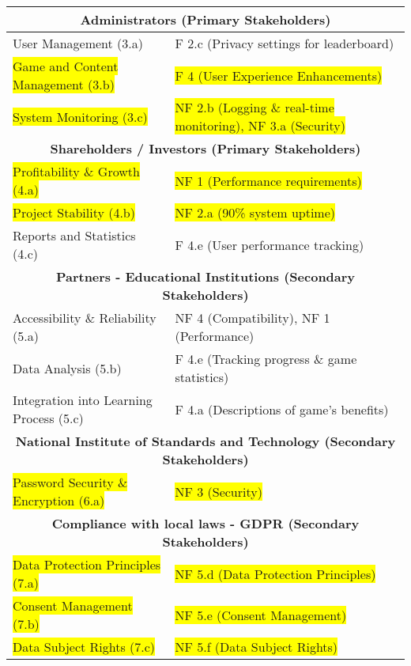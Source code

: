 \documentclass[11pt,a4paper]{article}
\begin{document}
\begin{table}[H]
\begin{tabular}{|l|l|}
\hline
\multicolumn{2}{|c|}{\textbf{Administrators (Primary Stakeholders)}}                                   \\
\hline
User Management (3.a)                 &  F 2.c (Privacy settings for leaderboard)    \\
\colorbox{yellow}{Game and Content Management (3.b)}            & \colorbox{yellow}{F 4 (User Experience Enhancements)  }         \\
\colorbox{yellow}{System Monitoring (3.c)}   & \colorbox{yellow}{NF 2.b (Logging \& real-time monitoring), NF 3.a (Security)} \\
\hline
\multicolumn{2}{|c|}{\textbf{Shareholders / Investors (Primary Stakeholders)}}                         \\
\hline
\colorbox{yellow}{Profitability \& Growth (4.a) }               & \colorbox{yellow}{NF 1 (Performance requirements)  }            \\
\colorbox{yellow}{Project Stability (4.b) }                     & \colorbox{yellow}{NF 2.a (90\% system uptime)}                  \\
Reports and Statistics (4.c)                 & F 4.e (User performance tracking)            \\
\hline
\multicolumn{2}{|c|}{\textbf{Partners - Educational Institutions (Secondary Stakeholders)}}            \\
\hline
Accessibility \& Reliability (5.a)           & NF 4 (Compatibility), NF 1 (Performance)     \\
Data Analysis (5.b)                          & F 4.e (Tracking progress \& game statistics) \\
Integration into Learning Process (5.c)      & F 4.a (Descriptions of game's benefits)      \\
\hline
\multicolumn{2}{|c|}{\textbf{National Institute of Standards and Technology (Secondary Stakeholders)}} \\
\hline
\colorbox{yellow}{Password Security \& Encryption (6.a)}        & \colorbox{yellow}{NF 3 (Security)  }                            \\
\hline
\multicolumn{2}{|c|}{\textbf{Compliance with local laws - GDPR (Secondary Stakeholders)}}              \\
\hline
\colorbox{yellow}{Data Protection Principles (7.a) }             &\colorbox{yellow}{ NF 5.d (Data Protection Principles) }         \\
\colorbox{yellow}{Consent Management (7.b)   }                  & \colorbox{yellow}{NF 5.e (Consent Management)  }                \\
\colorbox{yellow}{Data Subject Rights (7.c)  }                  & \colorbox{yellow}{NF 5.f (Data Subject Rights) }                \\
\hline
\end{tabular}


\end{table}
\end{document}
